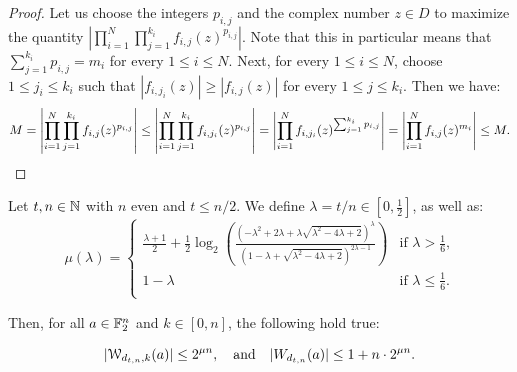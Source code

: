 \documentclass[11pt]{llncs}
\begin{document}
\begin{proof}
    Let us choose the integers $p_{i,j}$ and the complex number $z\in D$ to maximize the quantity $\left|\prod_{i=1}^N\prod_{j=1}^{k_i}f_{i,j}(z)^{p_{i,j}}\right|$. Note that this in particular means that $\sum_{j=1}^{k_i}p_{i,j}=m_i$ for every $1\leq i\leq N$. Next, for every $1\leq i\leq N$, choose $1\leq j_i\leq k_i$ such that $|f_{i,j_i}(z)|\geq|f_{i,j}(z)|$ for every $1\leq j\leq k_i$. Then we have:
    \[
        M=\left|\prod_{i=1}^N\prod_{j=1}^{k_i}f_{i,j}(z)^{p_{i,j}}\right|\leq\left|\prod_{i=1}^N\prod_{j=1}^{k_i}f_{i,j_i}(z)^{p_{i,j}}\right|=\left|\prod_{i=1}^Nf_{i,j_i}(z)^{\sum_{j=1}^{k_i}p_{i,j}}\right|=\left|\prod_{i=1}^Nf_{i,j}(z)^{m_i}\right|\leq M.\qedhere
    \]
\end{proof}

\begin{theorem}\label{theorem:bound_D_nka_generalized}
    Let $t, n\in \mathbb{N}$ with $n$ even and $t\le n/2$. 
    We define $\lambda=t/n\in\left[0,\frac 12\right]$, as well as:
    \[
        \mu(\lambda)=
        \begin{cases}
            \frac{\lambda+1}{2}+\frac12\log_2\left(\frac{\left(-\lambda^2+2\lambda+\lambda\sqrt{\lambda^2-4\lambda+2}\right)^\lambda}{\left(1-\lambda+\sqrt{\lambda^2-4\lambda+2}\right)^{2\lambda-1}}\right)&\text{if $\lambda>\frac 16$,}\\
            1-\lambda&\text{if $\lambda\leq\frac 16$.}\\
        \end{cases}
    \]

    Then, for all $a\in\mathbb{F}_2^n$ and $k\in[0,n]$, the following hold true:

    \[
        |\mathcal{W}_{d_{t,n},k}(a)|\leq 2^{\mu n},\quad \text{and} \quad  |W_{d_{t,n}}(a)|\leq 1+n\cdot 2^{\mu n}.
    \]
\end{theorem}
\end{document}
